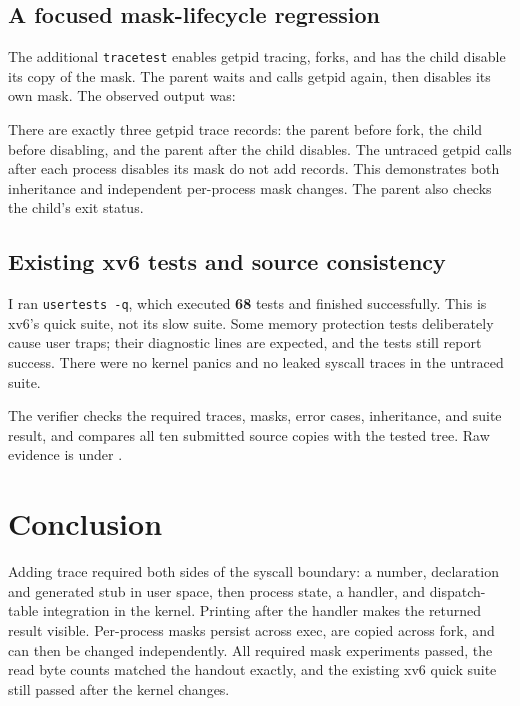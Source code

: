 \documentclass[12pt]{article}
\begin{document}
\clearpage
\subsection{A focused mask-lifecycle regression}
The additional \texttt{tracetest} enables getpid tracing, forks, and has
the child disable its copy of the mask. The parent waits and calls getpid
again, then disables its own mask. The observed output was:

There are exactly three getpid trace records: the parent before fork, the
child before disabling, and the parent after the child disables. The
untraced getpid calls after each process disables its mask do not add
records. This demonstrates both inheritance and independent per-process
mask changes. The parent also checks the child's exit status.

\subsection{Existing xv6 tests and source consistency}
I ran \texttt{usertests -q}, which executed \textbf{68} tests and finished
successfully. This is xv6's quick suite, not its slow suite. Some memory
protection tests deliberately cause user traps; their diagnostic lines are
expected, and the tests still report success. There were no kernel panics
and no leaked syscall traces in the untraced suite.

The verifier checks the required traces, masks, error cases, inheritance,
and suite result, and compares all ten submitted source copies with the
tested tree. Raw evidence is under .

\section{Conclusion}
Adding trace required both sides of the syscall boundary: a number,
declaration and generated stub in user space, then process state, a handler,
and dispatch-table integration in the kernel. Printing after the handler
makes the returned result visible. Per-process masks persist across exec,
are copied across fork, and can then be changed independently. All required
mask experiments passed, the read byte counts matched the handout exactly,
and the existing xv6 quick suite still passed after the kernel changes.
\end{document}
